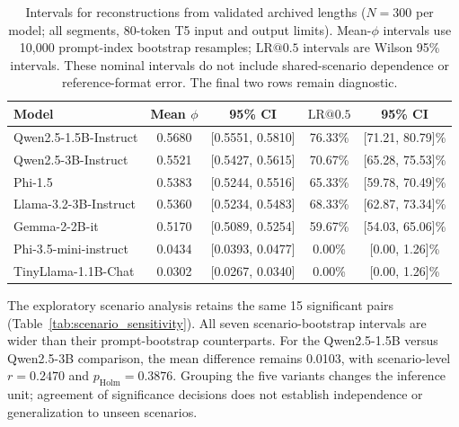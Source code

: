 \documentclass[electronics,article,submit,pdftex,moreauthors]{Definitions/mdpi}
\begin{document}
\begin{table}[ht]
\centering
\caption{Intervals for reconstructions from validated archived lengths ($N=300$ per model; all segments, 80-token T5 input and output limits). Mean-$\phi$ intervals use 10,000 prompt-index bootstrap resamples; $\mathrm{LR}@0.5$ intervals are Wilson 95\% intervals. These nominal intervals do not include shared-scenario dependence or reference-format error. The final two rows remain diagnostic.}
\label{tab:statistical_results}
\begin{tabular}{l c c c c}
\toprule
Model & Mean $\phi$ & 95\% CI & $\mathrm{LR}@0.5$ & 95\% CI \\
\midrule
Qwen2.5-1.5B-Instruct & 0.5680 & [0.5551, 0.5810] & 76.33\% & [71.21, 80.79]\% \\
Qwen2.5-3B-Instruct & 0.5521 & [0.5427, 0.5615] & 70.67\% & [65.28, 75.53]\% \\
Phi-1.5 & 0.5383 & [0.5244, 0.5516] & 65.33\% & [59.78, 70.49]\% \\
Llama-3.2-3B-Instruct & 0.5360 & [0.5234, 0.5483] & 68.33\% & [62.87, 73.34]\% \\
Gemma-2-2B-it & 0.5170 & [0.5089, 0.5254] & 59.67\% & [54.03, 65.06]\% \\
Phi-3.5-mini-instruct & 0.0434 & [0.0393, 0.0477] & 0.00\% & [0.00, 1.26]\% \\
TinyLlama-1.1B-Chat & 0.0302 & [0.0267, 0.0340] & 0.00\% & [0.00, 1.26]\% \\
\bottomrule
\end{tabular}
\end{table}

The exploratory scenario analysis retains the same 15 significant pairs (Table~\ref{tab:scenario_sensitivity}). All seven scenario-bootstrap intervals are wider than their prompt-bootstrap counterparts. For the Qwen2.5-1.5B versus Qwen2.5-3B comparison, the mean difference remains 0.0103, with scenario-level $r=0.2470$ and $p_{\mathrm{Holm}}=0.3876$. Grouping the five variants changes the inference unit; agreement of significance decisions does not establish independence or generalization to unseen scenarios.
\end{document}
